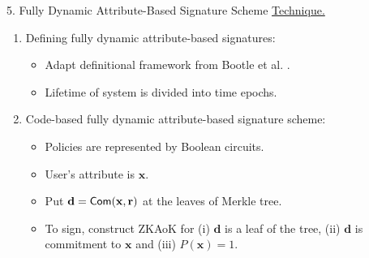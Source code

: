 \begin{frame}{5. Fully Dynamic Attribute-Based Signature Scheme}
	\underline{Technique.}\pause
	\begin{enumerate}
		\item Defining fully dynamic attribute-based signatures:\pause
		\begin{itemize}
			\item Adapt definitional framework from Bootle et al. \cite{BootleCCGG16}.\pause
			\item Lifetime of system is divided into time epochs.\pause
		\end{itemize}
		\item Code-based fully dynamic attribute-based signature scheme:\pause
		\begin{itemize}
			\item Policies are represented by Boolean circuits.\pause
			\item User's attribute is $\mathbf{x}$. \pause
			\item Put $\mathbf{d} = \mathsf{Com }(\mathbf{x}, \mathbf{r})$ at the leaves of Merkle tree. \pause
			\item To sign, construct ZKAoK for (i) $\mathbf{d}$ is a leaf of the tree, (ii) $\mathbf{d}$ is commitment to $\mathbf{x}$ and (iii) $P(\mathbf{x}) = 1$.
		\end{itemize}
	\end{enumerate}
\end{frame}